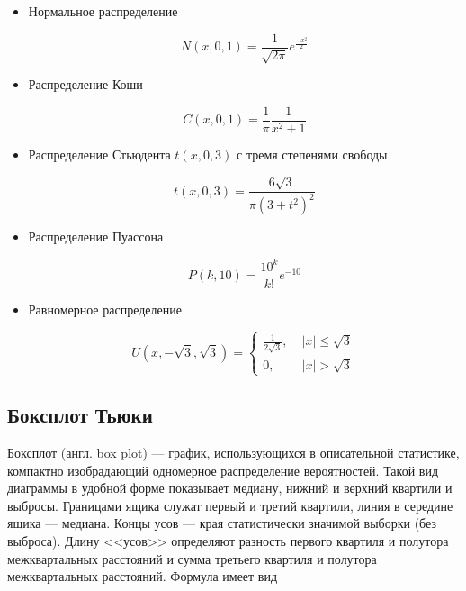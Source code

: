 \documentclass[12pt,a4paper]{article}
\begin{document}
	\begin{itemize}
		\item Нормальное распределение

		\begin{equation} \label{eq:normal}
			N(x, 0, 1) = \frac{1}{\sqrt{2\pi}}e^\frac{-x^2}{2}
		\end{equation}

		\item Распределение Коши

		\begin{equation} \label{eq:cauchy}
			C(x, 0, 1) = \frac{1}{\pi}\frac{1}{x^2+1}
		\end{equation}

		\item Распределение Стьюдента \( t(x, 0, 3) \) с тремя степенями свободы

		\begin{equation} \label{eq:student}
			t(x, 0, 3) = \frac{6\sqrt3}{\pi(3 + t^2)^2}
		\end{equation}

		\item Распределение Пуассона

		\begin{equation} \label{eq:poisson}
			P(k, 10) = \frac{10^k}{k!}e^{-10}
		\end{equation}

		\item Равномерное распределение

		\begin{equation} \label{eq:uniform}
			U(x, -\sqrt3, \sqrt3) = \begin{cases}
				\frac{1}{2\sqrt3}, & \; |x| \leq \sqrt3\\
				0, & \; |x| > \sqrt3
			\end{cases}
		\end{equation}
	\end{itemize}

	\subsection{Боксплот Тьюки}

	Боксплот (англ. box plot) — график, использующихся в описательной
	статистике, компактно изобрадающий одномерное распределение
	вероятностей. Такой вид диаграммы в удобной форме показывает медиану,
	нижний и верхний квартили и выбросы. Границами ящика служат первый и
	третий квартили, линия в середине ящика — медиана. Концы усов — края
	статистически значимой выборки (без выброса). Длину <<усов>> определяют
	разность первого квартиля и полутора межквартальных расстояний и сумма
	третьего квартиля и полутора межквартальных расстояний. Формула имеет
	вид
\end{document}
